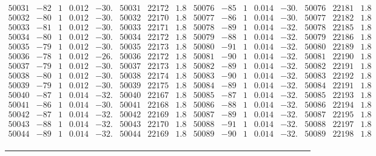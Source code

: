 \documentclass[11pt,reqno,a4letter]{article}
\numberwithin{figure}{section}
\numberwithin{table}{section}
\theoremstyle{plain}
\numberwithin{theorem}{section}
\theoremstyle{definition}
\begin{document}
\begin{table}[ht!]
\begin{equation*}
{\begin{array}{ccccc|ccc||ccccc|ccc}
50031 & -82 & 1 & 0.012 & -30. & 50031 & 22172 & 1.8 & 50076 & -85 & 1 & 0.014 & -30. & 50076 & 22181 & 1.8  \\
50032 & -80 & 1 & 0.012 & -30. & 50032 & 22170 & 1.8 & 50077 & -86 & 1 & 0.014 & -30. & 50077 & 22182 & 1.8  \\
50033 & -81 & 1 & 0.012 & -30. & 50033 & 22171 & 1.8 & 50078 & -89 & 1 & 0.014 & -32. & 50078 & 22185 & 1.8  \\
50034 & -80 & 1 & 0.012 & -30. & 50034 & 22172 & 1.8 & 50079 & -88 & 1 & 0.014 & -32. & 50079 & 22186 & 1.8  \\
50035 & -79 & 1 & 0.012 & -30. & 50035 & 22173 & 1.8 & 50080 & -91 & 1 & 0.014 & -32. & 50080 & 22189 & 1.8  \\
50036 & -78 & 1 & 0.012 & -26. & 50036 & 22172 & 1.8 & 50081 & -90 & 1 & 0.014 & -32. & 50081 & 22190 & 1.8  \\
50037 & -79 & 1 & 0.012 & -30. & 50037 & 22173 & 1.8 & 50082 & -89 & 1 & 0.014 & -32. & 50082 & 22191 & 1.8  \\
50038 & -80 & 1 & 0.012 & -30. & 50038 & 22174 & 1.8 & 50083 & -90 & 1 & 0.014 & -32. & 50083 & 22192 & 1.8  \\
50039 & -79 & 1 & 0.012 & -30. & 50039 & 22175 & 1.8 & 50084 & -89 & 1 & 0.014 & -32. & 50084 & 22191 & 1.8  \\
50040 & -87 & 1 & 0.014 & -32. & 50040 & 22167 & 1.8 & 50085 & -87 & 1 & 0.014 & -32. & 50085 & 22193 & 1.8  \\
50041 & -86 & 1 & 0.014 & -30. & 50041 & 22168 & 1.8 & 50086 & -88 & 1 & 0.014 & -32. & 50086 & 22194 & 1.8  \\
50042 & -87 & 1 & 0.014 & -32. & 50042 & 22169 & 1.8 & 50087 & -89 & 1 & 0.014 & -32. & 50087 & 22195 & 1.8  \\
50043 & -88 & 1 & 0.014 & -32. & 50043 & 22170 & 1.8 & 50088 & -91 & 1 & 0.014 & -32. & 50088 & 22197 & 1.8  \\
50044 & -89 & 1 & 0.014 & -32. & 50044 & 22169 & 1.8 & 50089 & -90 & 1 & 0.014 & -32. & 50089 & 22198 & 1.8  \\
\end{array}
}
\end{equation*} 

\bigskip\hrule\smallskip 


\end{table}
\end{document}
